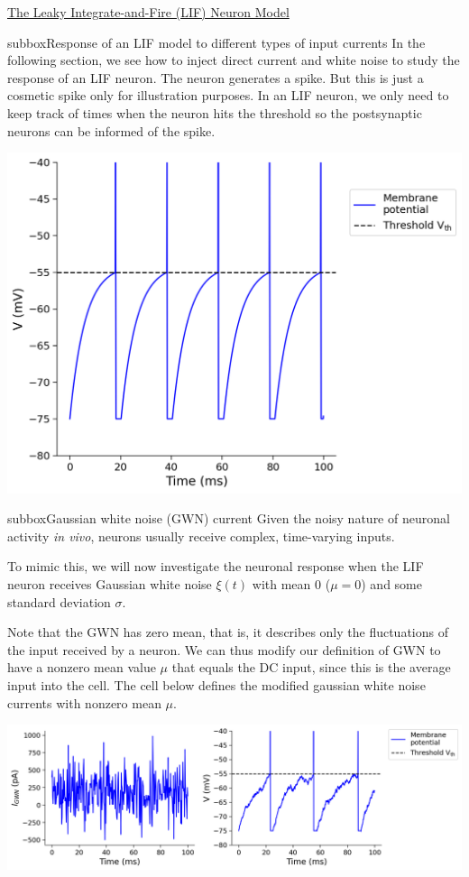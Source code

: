 \begin{textbox}{\href{https://compneuro.neuromatch.io/tutorials/W1D4_GeneralizedLinearModels/student/W1D4_Tutorial1.html}{The Leaky Integrate-and-Fire (LIF) Neuron Model } }
\begin{subbox}{subbox}{Response of an LIF model to different types of input currents}
\scriptsize
In the following section, we see how to inject direct current and white noise to study the response of an LIF neuron.
The neuron generates a spike. But this is just a cosmetic spike only for illustration purposes. In an LIF neuron, we only need to keep track of times when the neuron hits the threshold so the postsynaptic neurons can be informed of the spike. 

\centering
\includegraphics[scale=0.2]{Figures/BNM/LIF_Figure2.png}
\end{subbox}

\begin{subbox}{subbox}{Gaussian white noise (GWN) current 
}
\scriptsize
Given the noisy nature of neuronal activity \textit{in vivo}, neurons usually receive complex, time-varying inputs.

To mimic this, we will now investigate the neuronal response when the LIF neuron receives Gaussian white noise $\xi(t)$ with mean 0 ($\mu = 0$) and some standard deviation $\sigma$.

Note that the GWN has zero mean, that is, it describes only the fluctuations of the input received by a neuron. We can thus modify our definition of GWN to have a nonzero mean value $\mu$ that equals the DC input, since this is the average input into the cell. The cell below defines the modified gaussian white noise currents with nonzero mean $\mu$.

\centering
\includegraphics[scale=0.25]{Figures/BNM/LIF_Figure3.png}
\end{subbox}
\end{textbox}

